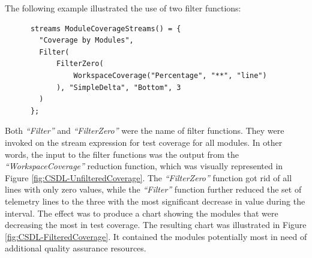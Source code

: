 The following example illustrated the use of two filter functions:

\begin{verbatim}
      streams ModuleCoverageStreams() = {
        "Coverage by Modules",
        Filter(
            FilterZero(
                WorkspaceCoverage("Percentage", "**", "line")
            ), "SimpleDelta", "Bottom", 3
        )
      };
\end{verbatim}

Both \textit{``Filter''} and \textit{``FilterZero''} were the name of filter functions. They were invoked on the stream expression for test coverage for all modules. In other words, the input to the filter functions was the output from the \textit{``WorkspaceCoverage''} reduction function, which was visually represented in Figure \ref{fig:CSDL-UnfilteredCoverage}. The \textit{``FilterZero''} function got rid of all lines with only zero values, while the \textit{``Filter''} function further reduced the set of telemetry lines to the three with the most significant decrease in value during the interval. The effect was to produce a chart showing the modules that were decreasing the most in test coverage. The resulting chart was illustrated in Figure \ref{fig:CSDL-FilteredCoverage}. It contained the modules potentially most in need of additional quality assurance resources.

